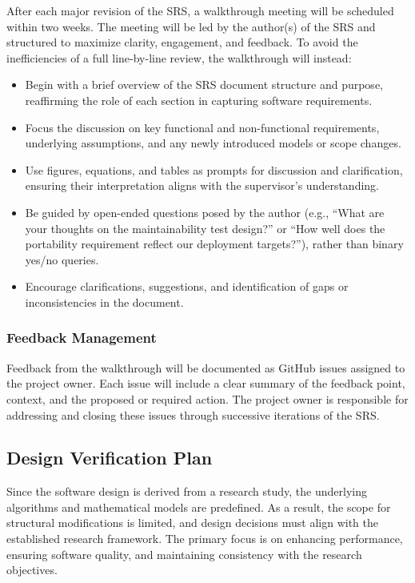 \documentclass[12pt, titlepage]{article}
\begin{document}
After each major revision of the SRS, a walkthrough meeting will be scheduled
within two weeks. The meeting will be led by the author(s) of the SRS and
structured to maximize clarity, engagement, and feedback. To avoid the
inefficiencies of a full line-by-line review, the walkthrough will instead:

\begin{itemize}
\item Begin with a brief overview of the SRS document structure and purpose,
  reaffirming the role of each section in capturing software requirements.
\item Focus the discussion on key functional and non-functional requirements,
  underlying assumptions, and any newly introduced models or scope changes.
\item Use figures, equations, and tables as prompts for discussion and
  clarification, ensuring their interpretation aligns with the supervisor’s
  understanding.
\item Be guided by open-ended questions posed by the author (e.g., “What are your
  thoughts on the maintainability test design?” or “How well does the
  portability requirement reflect our deployment targets?”), rather than binary
  yes/no queries.
\item Encourage clarifications, suggestions, and identification of gaps or
  inconsistencies in the document.
\end{itemize}

\subsubsection{Feedback Management}
\label{sec:feedbackmanagement}

Feedback from the walkthrough will be documented as GitHub issues assigned to
the project owner. Each issue will include a clear summary of the feedback
point, context, and the proposed or required action. The project owner is
responsible for addressing and closing these issues through successive
iterations of the SRS.


\subsection{Design Verification Plan}

Since the software design is derived from a research study, the underlying
algorithms and mathematical models are predefined. As a result, the scope for
structural modifications is limited, and design decisions must align with the
established research framework. The primary focus is on enhancing performance,
ensuring software quality, and maintaining consistency with the research
objectives.
\end{document}
